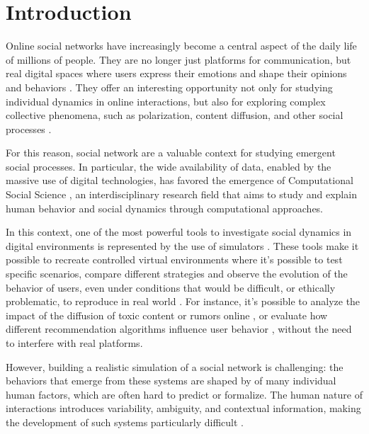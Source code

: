 \section{Introduction}
\label{sec:introduction}

Online social networks have increasingly become a central aspect of the daily life of millions of people.
They are no longer just platforms for communication, but real digital spaces where users express their emotions and shape their opinions and behaviors \cite{bakshy2015}.
They offer an interesting opportunity not only for studying individual dynamics in online interactions, but also for exploring complex collective phenomena, such as polarization, content diffusion, and other social processes \cite{vosoughi2018spread}.

For this reason, social network are a valuable context for studying emergent social processes.
In particular, the wide availability of data, enabled by the massive use of digital technologies, has favored the emergence of Computational Social Science \cite{lazer2009computational}, an interdisciplinary research field that aims to study and explain human behavior and social dynamics through computational approaches.

\medskip
In this context, one of the most powerful tools to investigate social dynamics in digital environments is represented by the use of simulators \cite{squazzoni2014socialsimulation}.
These tools make it possible to recreate controlled virtual environments where it's possible to test specific scenarios, compare different strategies and observe the evolution of the behavior of users, even under conditions that would be difficult, or ethically problematic, to reproduce in real world \cite{rossetti2024ysocialllmpoweredsocial}.
For instance, it's possible to analyze the impact of the diffusion of toxic content or rumors online \cite{hu2025simulatingrumorspreadingsocial}, or evaluate how different recommendation algorithms influence user behavior \cite{törnberg2023evaluate}, without the need to interfere with real platforms.

However, building a realistic simulation of a social network is challenging: the behaviors that emerge from these systems are shaped by of many individual human factors, which are often hard to predict or formalize.
The human nature of interactions introduces variability, ambiguity, and contextual information, making the development of such systems particularly difficult \cite{gao2023s3socialnetworksimulationlarge}.


